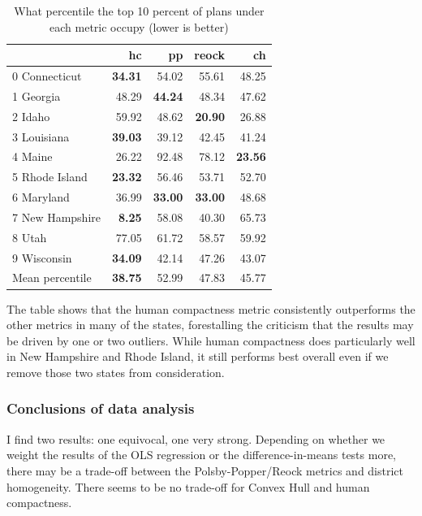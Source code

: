 \documentclass[]{article}
\begin{document}
\begin{table}[h!]
\begin{center}
\caption{What percentile the top 10 percent of plans under each metric occupy (lower is better)}
\label{table:top_plans_sd_percentile}
\begin{tabular}{@{\extracolsep{3pt}}lrrrr} 
\toprule
{} &     hc &     pp &  reock &     ch \\
\midrule
0 Connecticut &  \textbf{34.31} &  54.02 &  55.61 &  48.25 \\
1 Georgia &  48.29 &  \textbf{44.24} &  48.34 &  47.62 \\
2 Idaho &  59.92 &  48.62 &  \textbf{20.90} &  26.88 \\
3 Louisiana &  \textbf{39.03} &  39.12 &  42.45 &  41.24 \\
4 Maine &  26.22 &  92.48 &  78.12 &  \textbf{23.56} \\
5 Rhode Island &  \textbf{23.32} &  56.46 &  53.71 &  52.70 \\
6 Maryland &  36.99 &  \textbf{33.00} &  \textbf{33.00} &  48.68 \\
7 New Hampshire &   \textbf{8.25} &  58.08 &  40.30 &  65.73 \\
8 Utah &  77.05 &  61.72 &  58.57 &  59.92 \\
9 Wisconsin &  \textbf{34.09} &  42.14 &  47.26 &  43.07 \\
\bottomrule
Mean percentile & \textbf{38.75} &  52.99  &  47.83 &  45.77 \\
\bottomrule
\end{tabular}
\end{center}
\end{table}

The table shows that the human compactness metric consistently
outperforms the other metrics in many of the states, forestalling the
criticism that the results may be driven by one or two outliers. While
human compactness does particularly well in New Hampshire and Rhode
Island, it still performs best overall even if we remove those two
states from consideration.

\hypertarget{conclusions-of-data-analysis}{%
\subsubsection{Conclusions of data
analysis}\label{conclusions-of-data-analysis}}

I find two results: one equivocal, one very strong. Depending on whether
we weight the results of the OLS regression or the difference-in-means
tests more, there may be a trade-off between the Polsby-Popper/Reock
metrics and district homogeneity. There seems to be no trade-off for
Convex Hull and human compactness.
\end{document}
